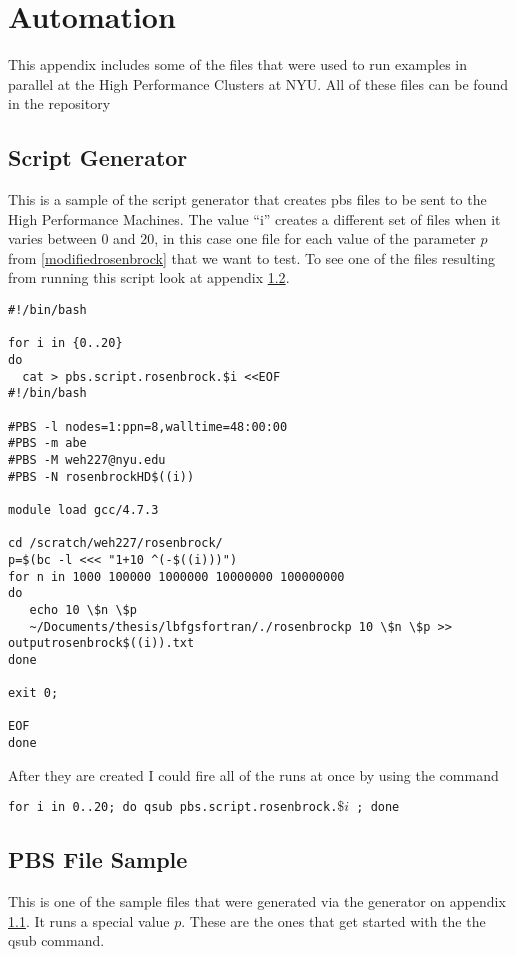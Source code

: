 \chapter{Automation}

This appendix includes some of the files that were used to run examples in parallel at the High Performance Clusters at NYU.  All of these files can be found in the repository \citep{lbfgsbNS}

\section{Script Generator} \label{pbsgenerator}

This is a sample of the script generator that creates pbs files to be sent to the High Performance Machines. The value ``i'' creates a different set of files when it varies between $0$ and $20$, in this case one file for each value of the parameter $p$ from \ref{modifiedrosenbrock} that we want to test. To see one of the files resulting from running this script look at appendix \ref{pbsfile}. 
\lstset{
  language=sh,
  firstnumber = 1
}

\begin{lstlisting}
#!/bin/bash

for i in {0..20}
do
  cat > pbs.script.rosenbrock.$i <<EOF
#!/bin/bash

#PBS -l nodes=1:ppn=8,walltime=48:00:00
#PBS -m abe
#PBS -M weh227@nyu.edu
#PBS -N rosenbrockHD$((i))

module load gcc/4.7.3

cd /scratch/weh227/rosenbrock/
p=$(bc -l <<< "1+10 ^(-$((i)))")
for n in 1000 100000 1000000 10000000 100000000
do
   echo 10 \$n \$p
   ~/Documents/thesis/lbfgsfortran/./rosenbrockp 10 \$n \$p >> outputrosenbrock$((i)).txt
done

exit 0;

EOF
done

\end{lstlisting}
After they are created I could fire all of the runs at once by using the command 

\label{qsubfire}
\texttt{for i in {0..20}; do qsub pbs.script.rosenbrock.$\$i$ ; done}


\section{PBS File Sample} \label{pbsfile}
This is one of the sample files that were generated via the generator on appendix  \ref{pbsgenerator}. It runs a special value $p$.  These are the ones that get started with the the qsub command.

